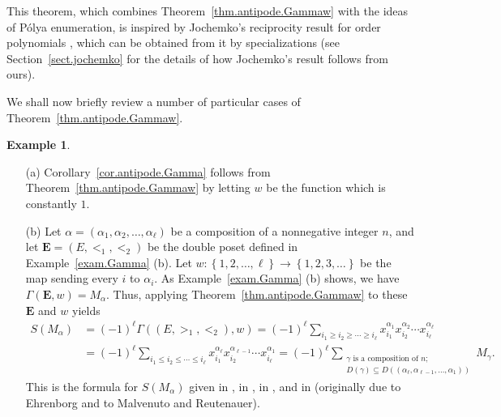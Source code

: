 \documentclass[12pt]{article}
\theoremstyle{plain}
\theoremstyle{definition}
\newtheorem{example}[theorem]{Example}
\theoremstyle{remark}
\let\sumnonlimits\sum
\renewcommand{\sum}{\sumnonlimits\limits}
\newcommand{\EE}{{\mathbf{E}}}
\begin{document}
This theorem, which combines Theorem~\ref{thm.antipode.Gammaw} with the
ideas of P\'olya enumeration, is inspired by Jochemko's reciprocity
result for order polynomials \cite[Theorem 2.8]{Joch}, which can be
obtained from it by specializations (see Section~\ref{sect.jochemko}
for the details of how Jochemko's result follows from ours).

We shall now briefly review a number of particular cases of
Theorem~\ref{thm.antipode.Gammaw}.

\begin{example}
\label{exam.antipode.Gammaw}

\begin{enumerate}

\item[(a)] Corollary~\ref{cor.antipode.Gamma}
follows from Theorem~\ref{thm.antipode.Gammaw} by letting $w$
be the function which is constantly $1$.

\item[(b)] Let
$\alpha = \left(\alpha_1, \alpha_2, \ldots, \alpha_\ell\right)$
be a composition of a nonnegative integer $n$, and let
$\EE = \left(E, <_1, <_2\right)$ be the double poset defined
in Example~\ref{exam.Gamma} (b). Let
$w : \left\{1, 2, \ldots, \ell\right\} \to \left\{ 1, 2, 3,
\ldots \right\}$ be the map sending every $i$ to $\alpha_i$.
As Example~\ref{exam.Gamma} (b) shows, we have
$\Gamma\left(\EE, w\right) = M_\alpha$.
Thus, applying Theorem~\ref{thm.antipode.Gammaw} to these $\EE$
and $w$ yields
\begin{align*}
S\left(M_\alpha\right)
&= \left(-1\right)^\ell
   \Gamma\left(\left(E, >_1, <_2\right), w\right)
= \left(-1\right)^\ell
  \sum_{i_1 \geq i_2 \geq \cdots \geq i_\ell}
  x_{i_1}^{\alpha_1} x_{i_2}^{\alpha_2} \cdots
      x_{i_\ell}^{\alpha_\ell} \\
&= \left(-1\right)^\ell
  \sum_{i_1 \leq i_2 \leq \cdots \leq i_\ell}
  x_{i_1}^{\alpha_\ell} x_{i_2}^{\alpha_{\ell-1}} \cdots
      x_{i_\ell}^{\alpha_1}
= \left(-1\right)^\ell
  \sum_{\substack{\gamma \text{ is a composition of } n ; \\
        D\left(\gamma\right) \subseteq
        D\left(\left(\alpha_\ell, \alpha_{\ell-1},
                     \ldots, \alpha_1\right)\right)}}
  M_\gamma .
\end{align*}
This is the formula for $S\left(M_\alpha\right)$
given in \cite[Proposition 3.4]{Ehrenb96},
in \cite[(4.26)]{Malve-Thesis}, in
\cite[Theorem 5.11]{Reiner}, and in
\cite[Theorem 4.1]{BenSag} (originally due to Ehrenborg
and to Malvenuto and Reutenauer).


\end{enumerate}
\end{example}
\end{document}
